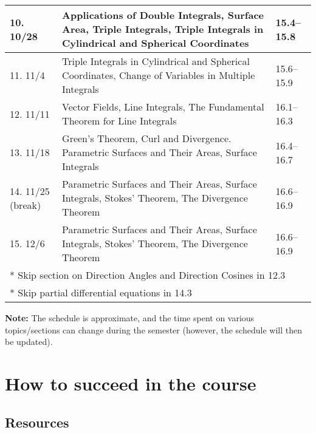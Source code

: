 \documentclass[oneside,11pt]{amsart}
\theoremstyle{definition}
\begin{document}
\begin{center}
\begin{longtable}{|l|p{}|l|}
    \hline
		10. 10/28 & Applications of Double Integrals, Surface Area, Triple Integrals, Triple Integrals in Cylindrical and Spherical Coordinates & 15.4--15.8 \\
    \hline
    11. 11/4 & Triple Integrals in Cylindrical and Spherical Coordinates,
		Change of Variables in Multiple Integrals & 15.6--15.9 \\
    \hline
		12. 11/11 & Vector Fields, Line Integrals, The Fundamental Theorem for Line Integrals & 16.1--16.3 \\
    \hline
    13. 11/18 & 
		Green's Theorem, Curl and Divergence. 
		Parametric Surfaces and Their Areas, Surface Integrals & 16.4--16.7 \\
    \hline
    14. 11/25
		(break) & Parametric Surfaces and Their Areas, Surface Integrals,
		Stokes' Theorem, The Divergence Theorem & 16.6--16.9 \\
    \hline
		15. 12/6 & 
		Parametric Surfaces and Their Areas, Surface Integrals,
		Stokes' Theorem, The Divergence Theorem
		& 16.6--16.9 \\
		\hline
    \multicolumn{3}{l}{* Skip section on Direction Angles and Direction Cosines in 12.3}\\
	\multicolumn{3}{l}{* Skip partial differential equations in 14.3} \\
\end{longtable}
\end{center}

\vspace{5pt}

\textbf{Note:} The schedule is approximate, and the time spent on various topics/sections can change during the semester (however, the schedule will then be updated).

\section{How to succeed in the course}

\subsection{Resources}
\end{document}
